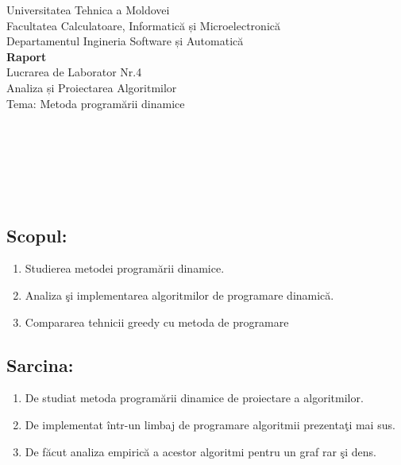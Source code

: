 \documentclass[14pt,a4paper]{extreport}
\begin{document}
\begin{titlepage}
\begin{center}
	{\large{ Universitatea Tehnica a Moldovei \\}}
	{\large{ Facultatea Calculatoare, Informatică și Microelectronică \\}}
	{\large{ Departamentul Ingineria Software și Automatică \\}}
	\vspace{4cm}
	{\LARGE {\bf{ Raport }}}\\
	\vspace{1cm}
	{\large { Lucrarea de Laborator Nr.4 \\}}
	{\large { Analiza și Proiectarea Algoritmilor \\}}
	{\large { Tema: Metoda programării dinamice   \\}}
\end{center}

\vspace{5cm}

 \\
 \\
\noindent{\null} \\
 \\
 \\

\vspace{5cm}

\end{titlepage}


\clearpage
\subsection*{Scopul:\\}
\begin{enumerate}
	\item Studierea metodei programării dinamice.
	\item Analiza şi implementarea algoritmilor de programare dinamică. 
	\item Compararea tehnicii greedy cu metoda de programare
\end{enumerate}

\subsection*{Sarcina:}
\begin{enumerate}
	\item De studiat metoda programării dinamice de proiectare a algoritmilor. 
	\item De implementat într-un limbaj de programare algoritmii prezentaţi mai sus. 
	\item De făcut analiza empirică a acestor algoritmi pentru un graf rar şi dens.
\end{enumerate}
 
\end{document}
